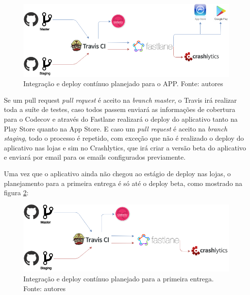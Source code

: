 \begin{figure}[H]
    \centering
    \includegraphics[scale=0.5]{figuras/ci_should_be.png}
    \caption[Integração e deploy contínuo planejado para o APP]{Integração e deploy contínuo planejado para o APP. Fonte: autores}
    \label{img:integracao_deploy_continuo_planejado_app}
\end{figure}

Se um pull request \textit{pull request} é aceito na \textit{branch} \textit{master}, o Travis irá realizar toda a suíte de testes, caso todos passem enviará as informações de cobertura para o
Codecov e através do Fastlane realizará o deploy do aplicativo tanto na Play Store quanto na App Store. E caso um \textit{pull request} é aceito na \textit{branch} \textit{staging}, todo o processo é repetido, com exceção
que não é realizado o deploy do aplicativo nas lojas e sim no Crashlytics, que irá criar a versão beta do aplicativo e enviará por email para os emails configurados previamente.

Uma vez que o aplicativo ainda não chegou ao estágio de deploy nas lojas, o planejamento para a primeira entrega é só até o deploy beta, como mostrado na figura \ref{img:integracao_deploy_continuo_planejado_primeira_entrega}:

\begin{figure}[H]
    \centering
    \includegraphics[scale=0.5]{figuras/ci_as_is.png}
    \caption[Integração e deploy contínuo planejado para a primeira entrega]{Integração e deploy contínuo planejado para a primeira entrega. Fonte: autores}
    \label{img:integracao_deploy_continuo_planejado_primeira_entrega}
\end{figure}

